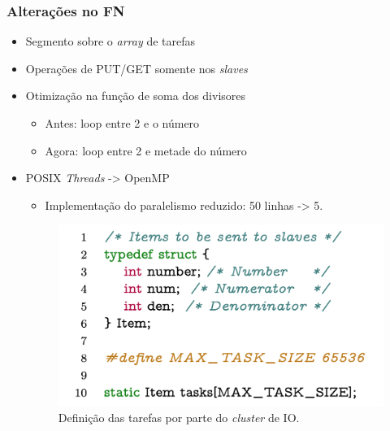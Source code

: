 \documentclass[xcolor={table}]{beamer}
\begin{document}
\begin{frame}\frametitle{Alterações no FN}
    \begin{itemize}
        \item {Segmento sobre o \textit{array} de tarefas}
        \item {Operações de PUT/GET somente nos \textit{slaves}}
        \item {Otimização na função de soma dos divisores}
        \begin{itemize}
            \item {Antes: loop entre 2 e o número}
            \item {Agora: loop entre 2 e metade do número}
        \end{itemize}
        \item {POSIX \textit{Threads} -> OpenMP}
        \begin{itemize}
            \item Implementação do paralelismo reduzido: 50 linhas -> 5.
        \end{itemize}
        \begin{figure}
            \centering
            \includegraphics[width=.5\linewidth, keepaspectratio]{figs/fnstructitemtask.png}
            \caption{Definição das tarefas por  parte do \textit{cluster} de IO.}
            \label{lst:structitemtask}
        \end{figure}
    \end{itemize}
\end{frame}
\end{document}
